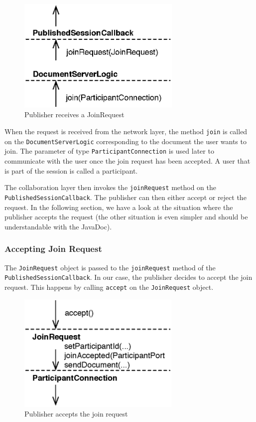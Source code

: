 \begin{figure}[H]
 \centering
 \includegraphics[width=7.83cm,height=5.50cm]{../images/finalreport/architecture_flows/join_request.eps}
 \caption{Publisher receives a JoinRequest}
 \label{fig:archoverview.flow.joinrequest}
\end{figure}

When the request is received from the network layer, the method
\texttt{join} is called on the \texttt{DocumentServerLogic} corresponding
to the document the user wants to join. The parameter of type 
\texttt{ParticipantConnection} is used later to communicate with the user
once the join request has been accepted. A user that is part of the session
is called a participant.

The collaboration layer then invokes the \texttt{joinRequest} method on
the \texttt{PublishedSessionCallback}. The publisher can then either accept or 
reject the request. In the following section, we have a look at the
situation where the publisher accepts the request (the other situation is
even simpler and should be understandable with the JavaDoc).

\subsubsection{Accepting Join Request}
The \texttt{JoinRequest} object is passed to the \texttt{joinRequest} method
of the \texttt{PublishedSessionCallback}. In our case, the publisher decides
to accept the join request. This happens by calling \texttt{accept} on the
\texttt{JoinRequest} object.

\begin{figure}[H]
 \centering
 \includegraphics[width=7.80cm,height=5.72cm]{../images/finalreport/architecture_flows/join_request_accept.eps}
 \caption{Publisher accepts the join request}
 \label{fig:archoverview.flow.joinrequestaccept}
\end{figure}

